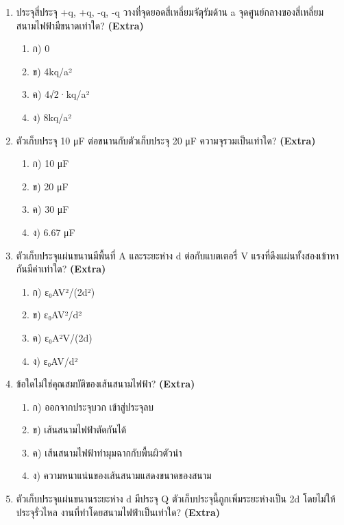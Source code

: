 \documentclass[12pt]{article}
\begin{document}
\begin{enumerate}[label=\arabic*.]
\begin{enumerate}[label=)]
\item ข) A ได้ Q/3, B ได้ 2Q/3
\item ค) A ได้ 2Q/3, B ได้ Q/3
\item ง) ทั้งหมดอยู่ที่ A
\end{enumerate}
\item ประจุสี่ประจุ +q, +q, -q, -q วางที่จุดยอดสี่เหลี่ยมจัตุรัมด้าน a จุดศูนย์กลางของสี่เหลี่ยม สนามไฟฟ้ามีขนาดเท่าใด? \hfill \textbf{\small (Extra)}
\begin{enumerate}[label=)]
\item ก) 0
\item ข) 4kq/a²
\item ค) 4√2·kq/a²
\item ง) 8kq/a²
\end{enumerate}
\item ตัวเก็บประจุ 10 μF ต่อขนานกับตัวเก็บประจุ 20 μF ความจุรวมเป็นเท่าใด? \hfill \textbf{\small (Extra)}
\begin{enumerate}[label=)]
\item ก) 10 μF
\item ข) 20 μF
\item ค) 30 μF
\item ง) 6.67 μF
\end{enumerate}
\item ตัวเก็บประจุแผ่นขนานมีพื้นที่ A และระยะห่าง d ต่อกับแบตเตอรี่ V แรงที่ดึงแผ่นทั้งสองเข้าหากันมีค่าเท่าใด? \hfill \textbf{\small (Extra)}
\begin{enumerate}[label=)]
\item ก) ε₀AV²/(2d²)
\item ข) ε₀AV²/d²
\item ค) ε₀A²V/(2d)
\item ง) ε₀AV/d²
\end{enumerate}
\item ข้อใดไม่ใช่คุณสมบัติของเส้นสนามไฟฟ้า? \hfill \textbf{\small (Extra)}
\begin{enumerate}[label=)]
\item ก) ออกจากประจุบวก เข้าสู่ประจุลบ
\item ข) เส้นสนามไฟฟ้าตัดกันได้
\item ค) เส้นสนามไฟฟ้าทำมุมฉากกับพื้นผิวตัวนำ
\item ง) ความหนาแน่นของเส้นสนามแสดงขนาดของสนาม
\end{enumerate}
\item ตัวเก็บประจุแผ่นขนานระยะห่าง d มีประจุ Q ตัวเก็บประจุนี้ถูกเพิ่มระยะห่างเป็น 2d โดยไม่ให้ประจุรั่วไหล งานที่ทำโดยสนามไฟฟ้าเป็นเท่าใด? \hfill \textbf{\small (Extra)}

\end{enumerate}
\end{document}
